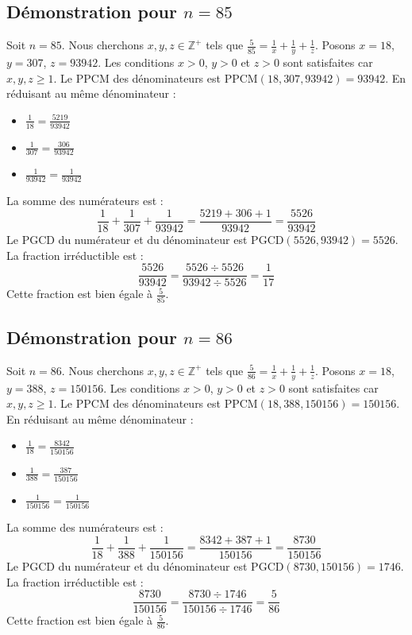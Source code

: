 \documentclass[11pt,a4paper]{article}
\begin{document}
\subsection{Démonstration pour $n = 85$}
Soit $n = 85$. Nous cherchons $x, y, z \in \mathbb{Z}^{+}$ tels que $\frac{5}{85} = \frac{1}{x} + \frac{1}{y} + \frac{1}{z}$.
Posons $x = 18$, $y = 307$, $z = 93942$.
Les conditions $x > 0$, $y > 0$ et $z > 0$ sont satisfaites car $x, y, z \geq 1$.
Le PPCM des dénominateurs est $\text{PPCM}(18, 307, 93942) = 93942$.
En réduisant au même dénominateur :
\begin{itemize}
    \item $\frac{1}{18} = \frac{5219}{93942}$
    \item $\frac{1}{307} = \frac{306}{93942}$
    \item $\frac{1}{93942} = \frac{1}{93942}$
\end{itemize}
La somme des numérateurs est :
$$ \frac{1}{18} + \frac{1}{307} + \frac{1}{93942} = \frac{5219 + 306 + 1}{93942} = \frac{5526}{93942} $$
Le PGCD du numérateur et du dénominateur est $\text{PGCD}(5526, 93942) = 5526$.
La fraction irréductible est :
$$ \frac{5526}{93942} = \frac{5526 \div 5526}{93942 \div 5526} = \frac{1}{17} $$
Cette fraction est bien égale à $\frac{5}{85}$.

\subsection{Démonstration pour $n = 86$}
Soit $n = 86$. Nous cherchons $x, y, z \in \mathbb{Z}^{+}$ tels que $\frac{5}{86} = \frac{1}{x} + \frac{1}{y} + \frac{1}{z}$.
Posons $x = 18$, $y = 388$, $z = 150156$.
Les conditions $x > 0$, $y > 0$ et $z > 0$ sont satisfaites car $x, y, z \geq 1$.
Le PPCM des dénominateurs est $\text{PPCM}(18, 388, 150156) = 150156$.
En réduisant au même dénominateur :
\begin{itemize}
    \item $\frac{1}{18} = \frac{8342}{150156}$
    \item $\frac{1}{388} = \frac{387}{150156}$
    \item $\frac{1}{150156} = \frac{1}{150156}$
\end{itemize}
La somme des numérateurs est :
$$ \frac{1}{18} + \frac{1}{388} + \frac{1}{150156} = \frac{8342 + 387 + 1}{150156} = \frac{8730}{150156} $$
Le PGCD du numérateur et du dénominateur est $\text{PGCD}(8730, 150156) = 1746$.
La fraction irréductible est :
$$ \frac{8730}{150156} = \frac{8730 \div 1746}{150156 \div 1746} = \frac{5}{86} $$
Cette fraction est bien égale à $\frac{5}{86}$.
\end{document}
